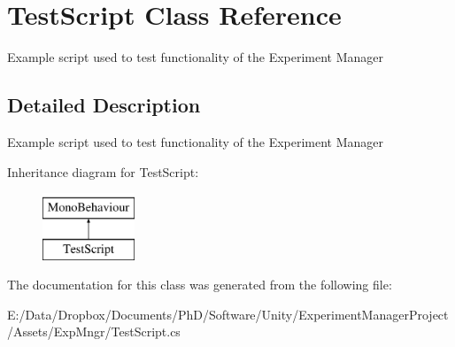 \hypertarget{class_test_script}{}\section{Test\+Script Class Reference}
\label{class_test_script}


Example script used to test functionality of the Experiment Manager  




\subsection{Detailed Description}
Example script used to test functionality of the Experiment Manager 

Inheritance diagram for Test\+Script\+:\begin{figure}[H]
\begin{center}
\leavevmode
\includegraphics[height=2.000000cm]{class_test_script}
\end{center}
\end{figure}


The documentation for this class was generated from the following file\+:\begin{DoxyCompactItemize}
\item 
E\+:/\+Data/\+Dropbox/\+Documents/\+Ph\+D/\+Software/\+Unity/\+Experiment\+Manager\+Project/\+Assets/\+Exp\+Mngr/Test\+Script.\+cs\end{DoxyCompactItemize}
